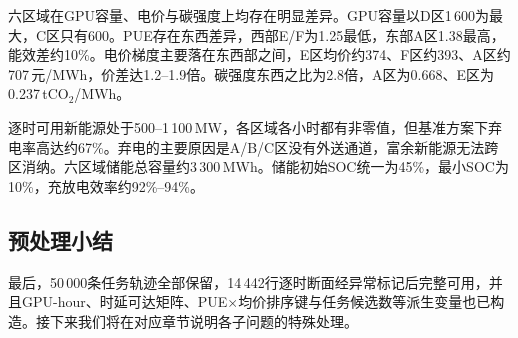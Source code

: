 六区域在GPU容量、电价与碳强度上均存在明显差异。GPU容量以D区1\,600为最大，C区只有600。PUE存在东西差异，西部E/F为1.25最低，东部A区1.38最高，能效差约10\%。电价梯度主要落在东西部之间，E区均价约374、F区约393、A区约707\,元/MWh，价差达1.2--1.9倍。碳强度东西之比为2.8倍，A区为0.668、E区为0.237\,tCO$_2$/MWh。

逐时可用新能源处于500--1\,100\,MW，各区域各小时都有非零值，但基准方案下弃电率高达约67\%。弃电的主要原因是A/B/C区没有外送通道，富余新能源无法跨区消纳。六区域储能总容量约3\,300\,MWh。储能初始SOC统一为45\%，最小SOC为10\%，充放电效率约92\%--94\%。

\subsection{预处理小结}

最后，50\,000条任务轨迹全部保留，14\,442行逐时断面经异常标记后完整可用，并且GPU-hour、时延可达矩阵、PUE$\times$均价排序键与任务候选数等派生变量也已构造。接下来我们将在对应章节说明各子问题的特殊处理。
